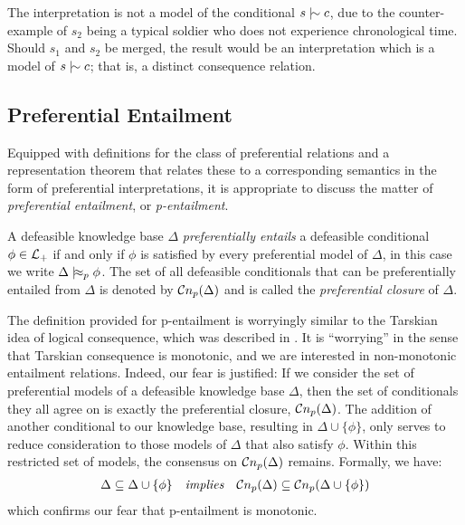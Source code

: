 The interpretation is not a model of the conditional $s \twiddle c$, due to the counter-example of $s_{2}$ being a typical
soldier who does not experience chronological time. Should $s_{1}$ and $s_{2}$ be merged, the result would be an interpretation
which is a model of $s\twiddle c$; that is, a distinct consequence relation.

\subsection{Preferential Entailment}
\label{subsection:preferential-entailment}

Equipped with definitions for the class of preferential relations and a representation theorem that relates these to a
corresponding semantics in the form of preferential interpretations, it is appropriate to discuss the matter of \textit{preferential
	entailment}, or \textit{p-entailment}.

\begin{definition}
	\label{definition:p-entailment}

	A defeasible knowledge base $\Delta$ \textit{preferentially entails} a defeasible conditional $\phi \in \mathcal{L}_+$ if and only
	if $\phi$ is satisfied by every preferential model of $\Delta$, in this case we write $\Delta \mid\hskip-0.40ex\approx_{p}\phi$. The set
	of all defeasible conditionals that can be preferentially entailed from $\Delta$ is denoted by $\mathcal{C}n_{p}(\Delta)$ and is
	called the \textit{preferential closure} of $\Delta$.
\end{definition}

The definition provided for p-entailment is worryingly similar to the Tarskian idea of logical consequence, which was
described in . It is ``worrying'' in the sense that Tarskian consequence is monotonic,
and we are interested in non-monotonic entailment relations. Indeed, our fear is justified: If we consider the set of preferential
models of a defeasible knowledge base $\Delta$, then the set of conditionals they all agree on is exactly the
preferential closure, $\mathcal{C}n_{p}(\Delta)$. The addition of another conditional to our knowledge base, resulting in $\Delta \cup
	\{\phi \}$, only serves to reduce consideration to those models of $\Delta$ that also satisfy $\phi$. Within this restricted
set of models, the consensus on $\mathcal{C}n_{p}(\Delta )$ remains. Formally, we have:
\begin{align}
	\Delta \subseteq \Delta \cup \{\phi\} \quad \textit{implies}\quad \mathcal{C}n_{p}(\Delta) \subseteq \mathcal{C}n_{p}(\Delta \cup \{ \phi \})
\end{align}
which confirms our fear that p-entailment is monotonic.

